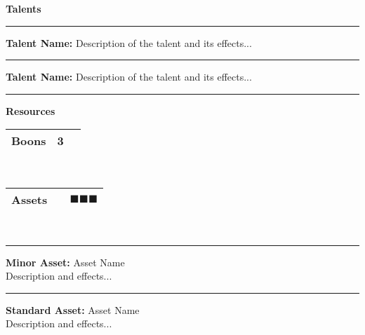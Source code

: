 \documentclass[10pt]{article}
\newcommand{\resourcebox}[3]{%
    \begin{tabular}{|>{\raggedright\arraybackslash}m{3.2cm}|>{\centering\arraybackslash}m{0.6cm}|>{\centering\arraybackslash}m{0.6cm}|}
    \hline
    \cellcolor{resourcebg} \textbf{\small #1} & \cellcolor{resourcebg} #2 & \cellcolor{resourcebg} #3 \\
    \hline
    \end{tabular}
}
\newcommand{\boon}{\textcolor{orange}{\ding{72}}}
\newcommand{\asset}{\textcolor{green!60!black}{$\blacksquare$}}
\begin{document}
\begin{mdframed}[backgroundcolor=background, linewidth=0pt]
\vspace{0.3cm}

\begin{mdframed}[backgroundcolor=sectionbg, linewidth=1pt, linecolor=accentcolor]
\textbf{\large Talents}
\end{mdframed}

\begin{adjustwidth}{0.2cm}{0.2cm}
\rule{\textwidth-0.4cm}{0.4pt}

\vspace{0.2cm}
\textbf{Talent Name:} Description of the talent and its effects...
\vspace{0.2cm}

\rule{\textwidth-0.4cm}{0.4pt}

\vspace{0.2cm}
\textbf{Talent Name:} Description of the talent and its effects...
\vspace{0.2cm}

\rule{\textwidth-0.4cm}{0.4pt}
\end{adjustwidth}

\vspace{0.3cm}

\begin{mdframed}[backgroundcolor=sectionbg, linewidth=1pt, linecolor=accentcolor]
\textbf{\large Resources}
\end{mdframed}

\begin{center}
\resourcebox{Boons}{3}{\boon\boon\boon} \\
\vspace{0.2cm}
\resourcebox{Assets}{}{\asset\asset\asset} \\
\end{center}

\vspace{0.3cm}

\begin{adjustwidth}{0.2cm}{0.2cm}
\rule{\textwidth-0.4cm}{0.4pt}

\vspace{0.1cm}
\textbf{Minor Asset:} Asset Name \\
Description and effects...
\vspace{0.1cm}

\rule{\textwidth-0.4cm}{0.4pt}

\vspace{0.1cm}
\textbf{Standard Asset:} Asset Name \\
Description and effects...
\vspace{0.1cm}


\end{adjustwidth}
\end{mdframed}
\end{document}
